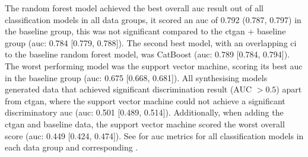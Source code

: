 \documentclass[12pt, a4paper]{article}
\begin{document}
The random forest model achieved the best overall \acrshort{auc} result out of all classification models in all data
groups, it scored an \acrshort{auc} of 0.792 (0.787, 0.797) in the baseline group, this was not significant compared to
the \acrshort{ctgan} + baseline group (\acrshort{auc}: 0.784 [0.779, 0.788]). The second best model, with an
overlapping \acrshort{ci} to the baseline random forest model, was CatBoost (\acrshort{auc}: 0.789 [0.784, 0.794]). The
worst performing model was the support vector machine, scoring its best \acrshort{auc} in the baseline group
(\acrshort{auc}: 0.675 [0.668, 0.681]). All synthesising models generated data that achieved significant discrimination
result (AUC $> 0.5$) apart from \acrshort{ctgan}, where the support vector machine could not achieve a significant
discriminatory \acrshort{auc} (\acrshort{auc}: 0.501 [0.489, 0.514]). Additionally, when adding the \acrshort{ctgan}
and baseline data, the support vector machine scored the worst overall score (\acrshort{auc}: 0.449 [0.424, 0.474]).
See  for \acrshort{auc} metrics for all classification models in each data group and corresponding
.
\end{document}
